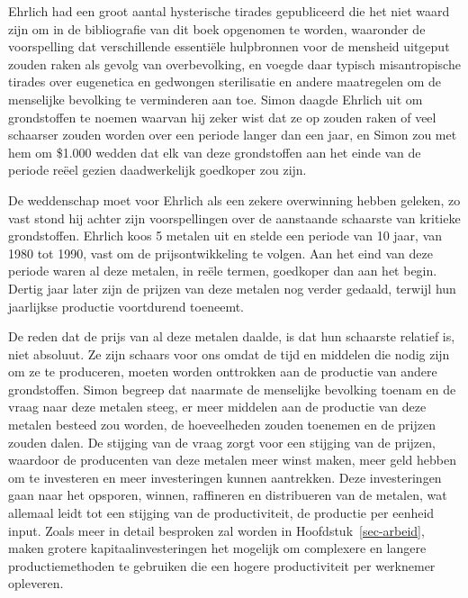 \documentclass[
  a5paper,
  smalldemyvopaper,11pt,twoside,onecolumn,openright,extrafontsizes,
hidelinks]{memoir}
\begin{document}
Ehrlich had een groot aantal hysterische tirades gepubliceerd die het
niet waard zijn om in de bibliografie van dit boek opgenomen te worden,
waaronder de voorspelling dat verschillende essentiële hulpbronnen voor
de mensheid uitgeput zouden raken als gevolg van overbevolking, en
voegde daar typisch misantropische tirades over eugenetica en gedwongen
sterilisatie en andere maatregelen om de menselijke bevolking te
verminderen aan toe. Simon daagde Ehrlich uit om grondstoffen te noemen
waarvan hij zeker wist dat ze op zouden raken of veel schaarser zouden
worden over een periode langer dan een jaar, en Simon zou met hem om
\$1.000 wedden dat elk van deze grondstoffen aan het einde van de
periode reëel gezien daadwerkelijk goedkoper zou zijn.

De weddenschap moet voor Ehrlich als een zekere overwinning hebben
geleken, zo vast stond hij achter zijn voorspellingen over de aanstaande
schaarste van kritieke grondstoffen. Ehrlich koos 5 metalen uit en
stelde een periode van 10 jaar, van 1980 tot 1990, vast om de
prijsontwikkeling te volgen. Aan het eind van deze periode waren al deze
metalen, in reële termen, goedkoper dan aan het begin. Dertig jaar later
zijn de prijzen van deze metalen nog verder gedaald, terwijl hun
jaarlijkse productie voortdurend toeneemt.

De reden dat de prijs van al deze metalen daalde, is dat hun schaarste
relatief is, niet absoluut. Ze zijn schaars voor ons omdat de tijd en
middelen die nodig zijn om ze te produceren, moeten worden onttrokken
aan de productie van andere grondstoffen. Simon begreep dat naarmate de
menselijke bevolking toenam en de vraag naar deze metalen steeg, er meer
middelen aan de productie van deze metalen besteed zou worden, de
hoeveelheden zouden toenemen en de prijzen zouden dalen. De stijging van
de vraag zorgt voor een stijging van de prijzen, waardoor de producenten
van deze metalen meer winst maken, meer geld hebben om te investeren en
meer investeringen kunnen aantrekken. Deze investeringen gaan naar het
opsporen, winnen, raffineren en distribueren van de metalen, wat
allemaal leidt tot een stijging van de productiviteit, de productie per
eenheid input. Zoals meer in detail besproken zal worden in
Hoofdstuk~\ref{sec-arbeid}, maken grotere kapitaalinvesteringen het
mogelijk om complexere en langere productiemethoden te gebruiken die een
hogere productiviteit per werknemer opleveren.
\end{document}
